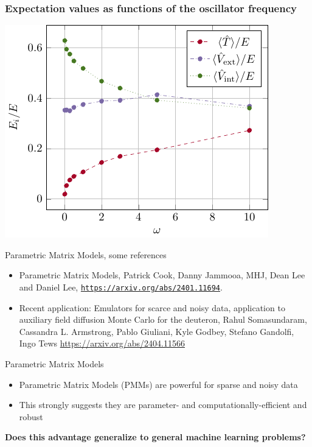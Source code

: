 \documentclass[11pt]{beamer} %
\begin{document}
\begin{frame}
\frametitle{Expectation values as functions of the oscillator frequency}


\vspace{6mm}

\centerline{\includegraphics[width=0.8\linewidth]{figures/virialtheorem.pdf}}

\vspace{6mm}

\end{frame}

\begin{frame}[t]{Parametric Matrix Models, some references}
  \begin{itemize}
    \item Parametric Matrix Models, Patrick Cook, Danny Jammooa, MHJ, Dean Lee and Daniel Lee, \href{{https://arxiv.org/abs/2401.11694}}{\nolinkurl{https://arxiv.org/abs/2401.11694}}. 
    \item Recent application: Emulators for scarce and noisy data, application to auxiliary field diffusion Monte Carlo for the deuteron, Rahul Somasundaram, Cassandra L. Armstrong, Pablo Giuliani, Kyle Godbey, Stefano Gandolfi, Ingo Tews \url{https://arxiv.org/abs/2404.11566}
    \end{itemize}
\end{frame}



\begin{frame}[t]{Parametric Matrix Models}
    \begin{itemize}
        \item Parametric Matrix Models (PMMs) are powerful for sparse and noisy data
        \item This strongly suggests they are parameter- and computationally-efficient and robust
    \end{itemize}
    \begin{shaded*}
        \textbf{Does this advantage generalize to general machine learning problems?}
    \end{shaded*}
\end{frame}
\end{document}
